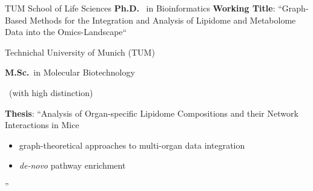 {%
	TUM School of Life Sciences}
{%
	\textbf{Ph.D.}~ in Bioinformatics}
{%
	\textbf{Working Title}: ``Graph-Based Methods for the Integration and Analysis of Lipidome and Metabolome Data into the Omics-Landscape``%
}

{%
	Technichal University of Munich (TUM)}
{%
	\textbf{M.Sc.}~in Molecular Biotechnology\begin{footnotesize}
		~(with high distinction) %
\end{footnotesize}}
{%
	\textbf{Thesis}: ``Analysis of Organ-specific Lipidome Compositions and their Network Interactions in Mice%
	\begin{itemize}
		\item graph-theoretical approaches to multi-organ data integration
		\item \textit{de-novo} pathway enrichment
	\end{itemize}
''}

